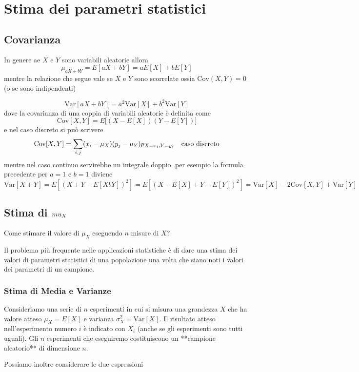 \documentclass[onecolumn,12pt]{book}\usepackage[]{graphicx}\usepackage[]{color}
\begin{document}
\section{Stima dei parametri statistici}
\subsection{ Covarianza}


In genere ae $X$ e $Y$  sono variabili aleatorie allora
\[\mu_{a X+ bY}=E[a X + b Y] = a E[X] + b E[Y]\]
mentre la relazione che segue vale se $X$ e $Y$ sono scorrelate ossia $\textrm{Cov}(X,Y)=0$ (o se sono indipendenti)

\[\textrm{Var}[a X+b Y]=a^2 \textrm{Var}[X]+b^2 \textrm{Var}[Y]\]
dove la covarianza di una coppia di variabili aleatorie  è definita come 
\[\mathrm{Cov}[X, Y] = E\bigl[(X - E[X]) (Y - E[Y])\bigr]\]
e nel caso discreto si può scrivere \[\mathrm{Cov}[X, Y] =\sum_{i,j} (x_i -\mu_X)(y_j-\mu_Y) p_{X=x_i,Y=y_j}\quad \hbox{caso discreto}\]
mentre nel caso continuo servirebbe un integrale  doppio.
per esempio la formula precedente per $a=1$ e $b=1$ diviene 
\[\mathrm{Var}[X+Y]=E[(X+Y-E[XbY])^2]=E[(X-E[X]+ Y-E[Y])^2]=\mathrm{Var}[X]-2 \mathrm{Cov}[X,Y]+\mathrm{Var}[Y] \]

\subsection{Stima di $\\mu_X$}

Come stimare il valore di $\mu_X$ eseguendo $n$ misure di $X$? 

Il problema più frequente nelle applicazioni statistiche è di dare una stima dei valori di parametri statistici di una popolazione una volta che siano noti i valori dei parametri di un campione.   

\subsubsection{Stima di Media e Varianze}

Consideriamo una serie di $n$ esperimenti in cui si misura una grandezza $X$ che ha valore atteso $\mu_X=E[X]$ e varianza $\sigma^2_X=\mathrm{Var}[X]$. 
Il risultato  atteso nell'esperimento numero $i$ è indicato con $X_i$ (anche se gli esperimenti sono tutti uguali). Gli $n$ esperimenti che eseguiremo costituiscono un **campione aleatorio** di dimensione $n$. 

Possiamo inoltre  considerare le due espressioni
\end{document}
